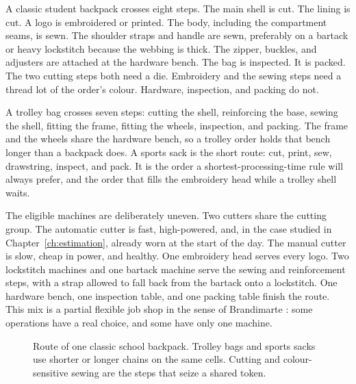 A classic student backpack crosses eight steps. The main shell is cut. The lining is cut. A logo is embroidered or printed. The body, including the compartment seams, is sewn. The shoulder straps and handle are sewn, preferably on a bartack or heavy lockstitch because the webbing is thick. The zipper, buckles, and adjusters are attached at the hardware bench. The bag is inspected. It is packed. The two cutting steps both need a die. Embroidery and the sewing steps need a thread lot of the order's colour. Hardware, inspection, and packing do not.

A trolley bag crosses seven steps: cutting the shell, reinforcing the base, sewing the shell, fitting the frame, fitting the wheels, inspection, and packing. The frame and the wheels share the hardware bench, so a trolley order holds that bench longer than a backpack does. A sports sack is the short route: cut, print, sew, drawstring, inspect, and pack. It is the order a shortest-processing-time rule will always prefer, and the order that fills the embroidery head while a trolley shell waits.

The eligible machines are deliberately uneven. Two cutters share the cutting group. The automatic cutter is fast, high-powered, and, in the case studied in Chapter~\ref{ch:estimation}, already worn at the start of the day. The manual cutter is slow, cheap in power, and healthy. One embroidery head serves every logo. Two lockstitch machines and one bartack machine serve the sewing and reinforcement steps, with a strap allowed to fall back from the bartack onto a lockstitch. One hardware bench, one inspection table, and one packing table finish the route. This mix is a partial flexible job shop in the sense of Brandimarte \cite{brandimarte1993}: some operations have a real choice, and some have only one machine.

\begin{figure}[ht]
\centering
{}
\caption{Route of one classic school backpack. Trolley bags and sports sacks use shorter or longer chains on the same cells. Cutting and colour-sensitive sewing are the steps that seize a shared token.}
\label{fig:backpack-route}
\end{figure}

